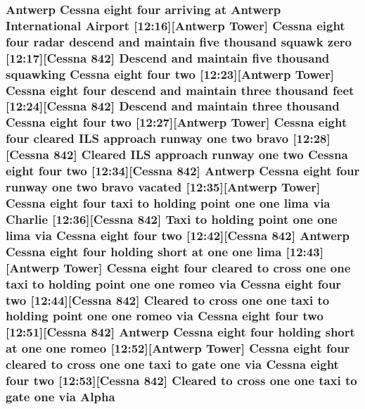 \subsubsection[{\texorpdfstring{Alpha}{Alpha}}]{\setlength{\rightskip}{0pt plus 5cm}Antwerp {\bf Cessna} eight four arriving at Antwerp International {\bf Airport} \mbox{[}12\+:16\mbox{]}\mbox{[}Antwerp {\bf Tower}\mbox{]} {\bf Cessna} eight four radar descend and maintain five {\bf thousand} squawk {\bf zero} \mbox{[}12\+:17\mbox{]}\mbox{[}{\bf Cessna} 842\mbox{]} Descend and maintain five {\bf thousand} {\bf squawking} {\bf Cessna} eight four {\bf two} \mbox{[}12\+:23\mbox{]}\mbox{[}Antwerp {\bf Tower}\mbox{]} {\bf Cessna} eight four descend and maintain three {\bf thousand} {\bf feet} \mbox{[}12\+:24\mbox{]}\mbox{[}{\bf Cessna} 842\mbox{]} Descend and maintain three {\bf thousand} {\bf Cessna} eight four {\bf two} \mbox{[}12\+:27\mbox{]}\mbox{[}Antwerp {\bf Tower}\mbox{]} {\bf Cessna} eight four cleared I\+LS approach runway {\bf one} {\bf two} {\bf bravo} \mbox{[}12\+:28\mbox{]}\mbox{[}{\bf Cessna} 842\mbox{]} Cleared I\+LS approach runway {\bf one} {\bf two} {\bf Cessna} eight four {\bf two} \mbox{[}12\+:34\mbox{]}\mbox{[}{\bf Cessna} 842\mbox{]} Antwerp {\bf Cessna} eight four runway {\bf one} {\bf two} {\bf bravo} vacated \mbox{[}12\+:35\mbox{]}\mbox{[}Antwerp {\bf Tower}\mbox{]} {\bf Cessna} eight four taxi to holding point {\bf one} {\bf one} {\bf lima} via {\bf Charlie} \mbox{[}12\+:36\mbox{]}\mbox{[}{\bf Cessna} 842\mbox{]} Taxi to holding point {\bf one} {\bf one} {\bf lima} via {\bf Cessna} eight four {\bf two} \mbox{[}12\+:42\mbox{]}\mbox{[}{\bf Cessna} 842\mbox{]} Antwerp {\bf Cessna} eight four holding short at {\bf one} {\bf one} {\bf lima} \mbox{[}12\+:43\mbox{]}\mbox{[}Antwerp {\bf Tower}\mbox{]} {\bf Cessna} eight four cleared to cross {\bf one} {\bf one} taxi to holding point {\bf one} {\bf one} {\bf romeo} via {\bf Cessna} eight four {\bf two} \mbox{[}12\+:44\mbox{]}\mbox{[}{\bf Cessna} 842\mbox{]} Cleared to cross {\bf one} {\bf one} taxi to holding point {\bf one} {\bf one} {\bf romeo} via {\bf Cessna} eight four {\bf two} \mbox{[}12\+:51\mbox{]}\mbox{[}{\bf Cessna} 842\mbox{]} Antwerp {\bf Cessna} eight four holding short at {\bf one} {\bf one} {\bf romeo} \mbox{[}12\+:52\mbox{]}\mbox{[}Antwerp {\bf Tower}\mbox{]} {\bf Cessna} eight four cleared to cross {\bf one} {\bf one} taxi to gate {\bf one} via {\bf Cessna} eight four {\bf two} \mbox{[}12\+:53\mbox{]}\mbox{[}{\bf Cessna} 842\mbox{]} Cleared to cross {\bf one} {\bf one} taxi to gate {\bf one} via Alpha}\hypertarget{happyDay3ATC_8txt_a81a3dae936b024aa7b8604489d418e64}{}\label{happyDay3ATC_8txt_a81a3dae936b024aa7b8604489d418e64}
